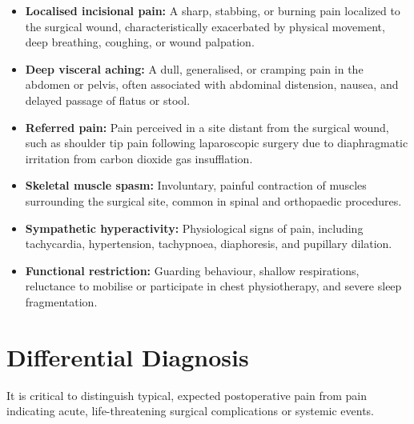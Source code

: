 \begin{itemize}
    \item \textbf{Localised incisional pain:} A sharp, stabbing, or burning pain localized to the surgical wound, characteristically exacerbated by physical movement, deep breathing, coughing, or wound palpation.
    \item \textbf{Deep visceral aching:} A dull, generalised, or cramping pain in the abdomen or pelvis, often associated with abdominal distension, nausea, and delayed passage of flatus or stool.
    \item \textbf{Referred pain:} Pain perceived in a site distant from the surgical wound, such as shoulder tip pain following laparoscopic surgery due to diaphragmatic irritation from carbon dioxide gas insufflation.
    \item \textbf{Skeletal muscle spasm:} Involuntary, painful contraction of muscles surrounding the surgical site, common in spinal and orthopaedic procedures.
    \item \textbf{Sympathetic hyperactivity:} Physiological signs of pain, including tachycardia, hypertension, tachypnoea, diaphoresis, and pupillary dilation.
    \item \textbf{Functional restriction:} Guarding behaviour, shallow respirations, reluctance to mobilise or participate in chest physiotherapy, and severe sleep fragmentation.
\end{itemize}

\section*{Differential Diagnosis}
It is critical to distinguish typical, expected postoperative pain from pain indicating acute, life-threatening surgical complications or systemic events.

